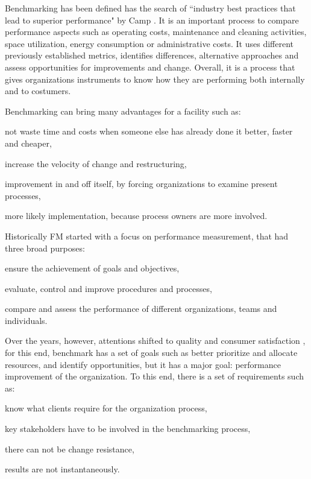 Benchmarking has been defined has the search of ``industry best practices that lead to superior performance" by Camp \cite{Camp1989}. It is an important process to compare performance aspects such as operating costs, maintenance and cleaning activities, space utilization, energy consumption or administrative costs. It uses different previously established metrics, identifies differences, alternative approaches and assess opportunities for improvements and change. Overall, it is a process that gives organizations instruments to know how they are performing both internally and to costumers.
 
Benchmarking can bring many advantages for a facility such as:
\begin{enumerate*}[label=\itshape\roman{enumi})]
	\item not waste time and costs when someone else has already done it better, faster and cheaper,
	\item increase the velocity of change and restructuring,
	\item improvement in and off itself, by forcing organizations to examine present processes,
	\item more likely implementation, because process owners are more involved.
\end{enumerate*}

Historically FM started with a focus on performance measurement, that had three broad purposes: 
\begin{enumerate*}[label=\itshape\roman{enumi})]
	\item ensure the achievement of goals and objectives, 
	\item evaluate, control and improve procedures and processes, 
	\item compare and assess the performance of different organizations, teams and individuals. 
\end{enumerate*}

Over the years, however, attentions shifted to quality and consumer satisfaction \cite{Pitt2008}, for this end, benchmark has a set of goals such as better prioritize and allocate resources, and identify opportunities, but it has a major goal: performance improvement of the organization. To this end, there is a set of requirements such as:
 \begin{enumerate*}[label=\itshape\roman{enumi})]
	\item know what clients require for the organization process,
	\item key stakeholders have to be involved in the benchmarking process,
	\item there can not be change resistance,
	\item results are not instantaneously.
\end{enumerate*}


